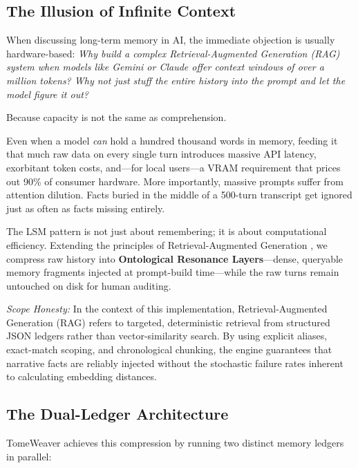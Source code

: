 \documentclass[12pt, a4paper]{article}
\begin{document}
\subsection{The Illusion of Infinite Context}

When discussing long-term memory in AI, the immediate objection is usually hardware-based: \textit{Why build a complex Retrieval-Augmented Generation (RAG) system when models like Gemini or Claude offer context windows of over a million tokens? Why not just stuff the entire history into the prompt and let the model figure it out?}

Because capacity is not the same as comprehension. 

Even when a model \textit{can} hold a hundred thousand words in memory, feeding it that much raw data on every single turn introduces massive API latency, exorbitant token costs, and---for local users---a VRAM requirement that prices out 90\% of consumer hardware. More importantly, massive prompts suffer from attention dilution. Facts buried in the middle of a 500-turn transcript get ignored just as often as facts missing entirely. 

The LSM pattern is not just about remembering; it is about computational efficiency. Extending the principles of Retrieval-Augmented Generation \citep{lewis2020rag}, we compress raw history into \textbf{Ontological Resonance Layers}---dense, queryable memory fragments injected at prompt-build time---while the raw turns remain untouched on disk for human auditing.

\textit{Scope Honesty:} In the context of this implementation, Retrieval-Augmented Generation (RAG) refers to targeted, deterministic retrieval from structured JSON ledgers rather than vector-similarity search. By using explicit aliases, exact-match scoping, and chronological chunking, the engine guarantees that narrative facts are reliably injected without the stochastic failure rates inherent to calculating embedding distances.

\subsection{The Dual-Ledger Architecture}

TomeWeaver achieves this compression by running two distinct memory ledgers in parallel:
\end{document}

